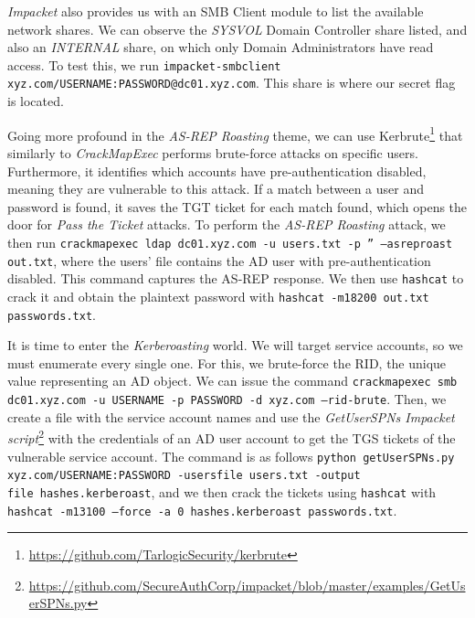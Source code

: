 \textit{Impacket} also provides us with an SMB Client module to list the available network shares. We can observe the \textit{SYSVOL} Domain Controller share listed, and also an \textit{INTERNAL} share, on which only Domain Administrators have read access. To test this, we run \texttt{impacket-smbclient xyz.com/USERNAME:PASSWORD@dc01.xyz.com}. This share is where our secret flag is located. 

Going more profound in the \textit{AS-REP Roasting} theme, we can use Kerbrute\footnote{\url{https://github.com/TarlogicSecurity/kerbrute}} that similarly to \textit{CrackMapExec} performs brute-force attacks on specific users. Furthermore, it identifies which accounts have pre-authentication disabled, meaning they are vulnerable to this attack. If a match between a user and password is found, it saves the TGT ticket for each match found, which opens the door for \textit{Pass the Ticket} attacks. To perform the \textit{AS-REP Roasting} attack, we then run \texttt{crackmapexec ldap dc01.xyz.com -u users.txt -p '' ---asreproast out.txt}, where the users' file contains the AD user with pre-authentication disabled. This command captures the AS-REP response. We then use \texttt{hashcat} to crack it and obtain the plaintext password with \texttt{hashcat -m18200 out.txt passwords.txt}. 

It is time to enter the \textit{Kerberoasting} world. We will target service accounts, so we must enumerate every single one. For this, we brute-force the RID, the unique value representing an AD object. We can issue the command \texttt{crackmapexec smb dc01.xyz.com -u USERNAME -p PASSWORD -d xyz.com ---rid-brute}. Then, we create a file with the service account names and use the \textit{GetUserSPNs Impacket script}\footnote{\url{https://github.com/SecureAuthCorp/impacket/blob/master/examples/GetUserSPNs.py}} with the credentials of an AD user account to get the TGS tickets of the vulnerable service account. The command is as follows \texttt{python getUserSPNs.py xyz.com/USERNAME:PASSWORD -usersfile users.txt -output\\file hashes.kerberoast}, and we then crack the tickets using \texttt{hashcat} with \texttt{hashcat -m13100 ---force -a 0 hashes.kerberoast passwords.txt}.

